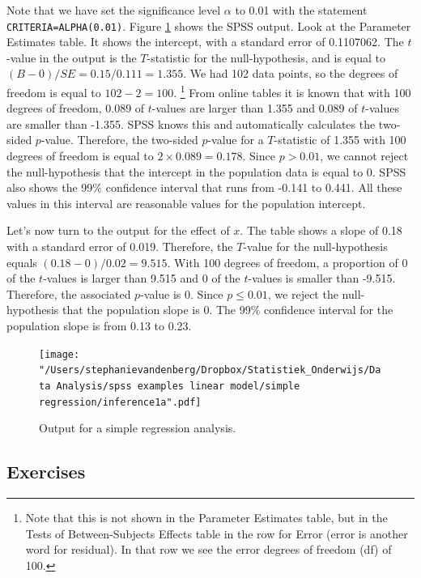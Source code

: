 \documentclass[]{report}\usepackage[]{graphicx}\usepackage[]{color}
\begin{document}
Note that we have set the significance level $\alpha$ to 0.01 with the statement \texttt{CRITERIA=ALPHA(0.01)}. Figure \ref{fig:inf_29} shows the SPSS output. Look at the Parameter Estimates table. It shows the intercept, with a standard error of 0.1107062. The $t$-value in the output is the $T$-statistic for the null-hypothesis, and is equal to $(B-0)/SE=0.15/0.111=1.355$. We had 102 data points, so the degrees of freedom is equal to $102-2=100$. \footnote{Note that this is not shown in the Parameter Estimates table, but in the Tests of Between-Subjects Effects table in the row for Error (error is another word for residual). In that row we see the error degrees of freedom (df) of 100.} From online tables it is known that with 100 degrees of freedom, 0.089 of $t$-values are larger than 1.355 and 0.089 of $t$-values are smaller than -1.355. SPSS knows this and automatically calculates the two-sided $p$-value. Therefore, the two-sided $p$-value for a $T$-statistic of 1.355 with 100 degrees of freedom is equal to $2 \times 0.089 = 0.178$. Since $p > 0.01$, we cannot reject the null-hypothesis that the intercept in the population data is equal to 0. SPSS also shows the 99\% confidence interval that runs from -0.141 to 0.441. All these values in this interval are reasonable values for the population intercept.

Let's now turn to the output for the effect of $x$. The table shows a slope of 0.18 with a standard error of 0.019. Therefore, the $T$-value for the null-hypothesis equals $(0.18-0)/0.02=9.515$. With 100 degrees of freedom, a proportion of 0 of the $t$-values is larger than 9.515 and 0 of the $t$-values is smaller than -9.515. Therefore, the associated $p$-value is 0. Since $p \leq 0.01$, we reject the null-hypothesis that the population slope is 0. The 99\% confidence interval for the population slope is from 0.13 to 0.23.

\begin{figure}[h!]
    \begin{center}
       \texttt{[image: "/Users/stephanievandenberg/Dropbox/Statistiek\_Onderwijs/Data Analysis/spss examples linear model/simple regression/inference1a".pdf]}
    \end{center}
    \caption{Output for a simple regression analysis.}
    \label{fig:inf_29}
\end{figure}


\subsection{Exercises}
\end{document}
